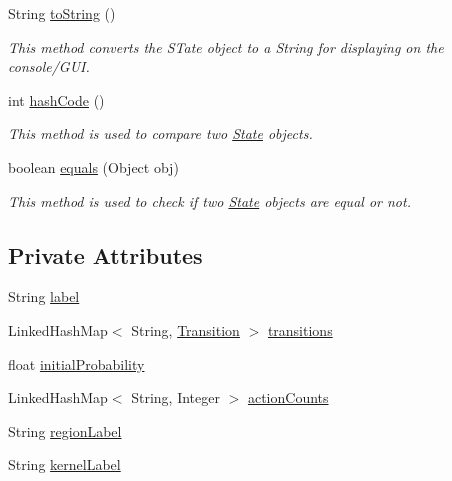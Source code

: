 \begin{DoxyCompactItemize}
String \hyperlink{classmdp_1_1core_1_1_state_a4118e0f9a6d4b0b3cc32a3f0250f7bc9}{to\+String} ()
\begin{DoxyCompactList}\small\item\em This method converts the S\+Tate object to a String for displaying on the console/\+G\+U\+I. \end{DoxyCompactList}\item 
int \hyperlink{classmdp_1_1core_1_1_state_aad74bf43336ba40cc3555f15387219d4}{hash\+Code} ()
\begin{DoxyCompactList}\small\item\em This method is used to compare two \hyperlink{classmdp_1_1core_1_1_state}{State} objects. \end{DoxyCompactList}\item 
boolean \hyperlink{classmdp_1_1core_1_1_state_adfe8841b55dcba54efd73e50f47b3cfc}{equals} (Object obj)
\begin{DoxyCompactList}\small\item\em This method is used to check if two \hyperlink{classmdp_1_1core_1_1_state}{State} objects are equal or not. \end{DoxyCompactList}\end{DoxyCompactItemize}
\subsection*{Private Attributes}
\begin{DoxyCompactItemize}
\item 
String \hyperlink{classmdp_1_1core_1_1_state_a40b54cc46e175c748d5ce129aba70633}{label}
\item 
Linked\+Hash\+Map$<$ String, \hyperlink{classmdp_1_1core_1_1_transition}{Transition} $>$ \hyperlink{classmdp_1_1core_1_1_state_a3c9b563199f7e235fe083b0d16da8cf3}{transitions}
\item 
float \hyperlink{classmdp_1_1core_1_1_state_a237d2d5f81db0553a2180cf66a20472b}{initial\+Probability}
\item 
Linked\+Hash\+Map$<$ String, Integer $>$ \hyperlink{classmdp_1_1core_1_1_state_a56e17de2fde7a7f4ee8b1491c11438d5}{action\+Counts}
\item 
String \hyperlink{classmdp_1_1core_1_1_state_aa6f24dca5cb78d028e99f69b9e6ccb2c}{region\+Label}
\item 
String \hyperlink{classmdp_1_1core_1_1_state_ac7ca184df7a0ec4141766692290c18ab}{kernel\+Label}
\end{DoxyCompactItemize}


